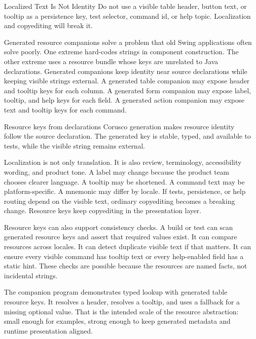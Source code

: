 \begin{pitfallbox}{Localized Text Is Not Identity}
Do not use a visible table header, button text, or tooltip as a persistence
key, test selector, command id, or help topic. Localization and copyediting will
break it.
\end{pitfallbox}

Generated resource companions solve a problem that old Swing applications
often solve poorly. One extreme hard-codes strings in component construction.
The other extreme uses a resource bundle whose keys are unrelated to Java
declarations. Generated companions keep identity near source declarations while
keeping visible strings external. A generated table companion may expose header
and tooltip keys for each column. A generated form companion may expose label,
tooltip, and help keys for each field. A generated action companion may expose
text and tooltip keys for each command.

\begin{coruscobox}{Resource keys from declarations}
Corusco generation makes resource identity follow the source declaration. The
generated key is stable, typed, and available to tests, while the visible
string remains external.
\end{coruscobox}

Localization is not only translation. It is also review, terminology,
accessibility wording, and product tone. A label may change because the product
team chooses clearer language. A tooltip may be shortened. A command text may
be platform-specific. A mnemonic may differ by locale. If tests, persistence,
or help routing depend on the visible text, ordinary copyediting becomes a
breaking change. Resource keys keep copyediting in the presentation layer.

Resource keys can also support consistency checks. A build or test can scan
generated resource keys and assert that required values exist. It can compare
resources across locales. It can detect duplicate visible text if that matters.
It can ensure every visible command has tooltip text or every help-enabled
field has a static hint. These checks are possible because the resources are
named facts, not incidental strings.

The \resourcesExample{} companion program demonstrates typed lookup with
generated table resource keys. It resolves a header, resolves a tooltip, and
uses a fallback for a missing optional value. That is the intended scale of the
resource abstraction: small enough for examples, strong enough to keep
generated metadata and runtime presentation aligned.

